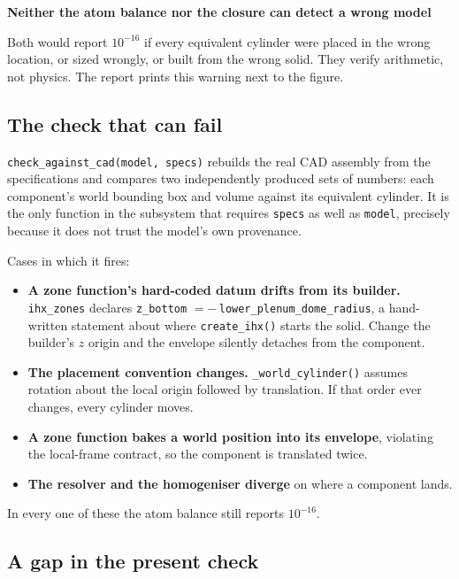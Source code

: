 \documentclass[9pt,a4paper]{extarticle}
\newcommand{\code}[1]{\texttt{\small #1}}
\newenvironment{caveat}[1]%
  {\par\medskip\noindent
   \begin{lrbox}{\caveatbox}%
   \begin{minipage}{\dimexpr\linewidth-2\fboxsep-2\fboxrule\relax}%
   \textbf{#1}\par\medskip}%
  {\end{minipage}%
   \end{lrbox}%
   \fcolorbox{warnrule}{warnbg}{\usebox{\caveatbox}}\par\medskip}
\begin{document}
\begin{caveat}{Neither the atom balance nor the closure can detect a wrong model}
Both would report $10^{-16}$ if every equivalent cylinder were placed in the
wrong location, or sized wrongly, or built from the wrong solid. They verify
arithmetic, not physics. The report prints this warning next to the figure.
\end{caveat}

\subsection{The check that can fail}

\code{check\_against\_cad(model, specs)} rebuilds the real CAD assembly from the
specifications and compares two independently produced sets of numbers: each
component's world bounding box and volume against its equivalent cylinder. It is
the only function in the subsystem that requires \code{specs} as well as
\code{model}, precisely because it does not trust the model's own provenance.

Cases in which it fires:

\begin{itemize}
  \item \textbf{A zone function's hard-coded datum drifts from its builder.}
    \code{ihx\_zones} declares \code{z\_bottom} $=-\,$\code{lower\_plenum\_dome\_radius},
    a hand-written statement about where \code{create\_ihx()} starts the solid.
    Change the builder's $z$ origin and the envelope silently detaches from the
    component.
  \item \textbf{The placement convention changes.} \code{\_world\_cylinder()}
    assumes rotation about the local origin followed by translation. If that
    order ever changes, every cylinder moves.
  \item \textbf{A zone function bakes a world position into its envelope},
    violating the local-frame contract, so the component is translated twice.
  \item \textbf{The resolver and the homogeniser diverge} on where a component
    lands.
\end{itemize}

\noindent
In every one of these the atom balance still reports $10^{-16}$.

\subsection{A gap in the present check}
\end{document}

